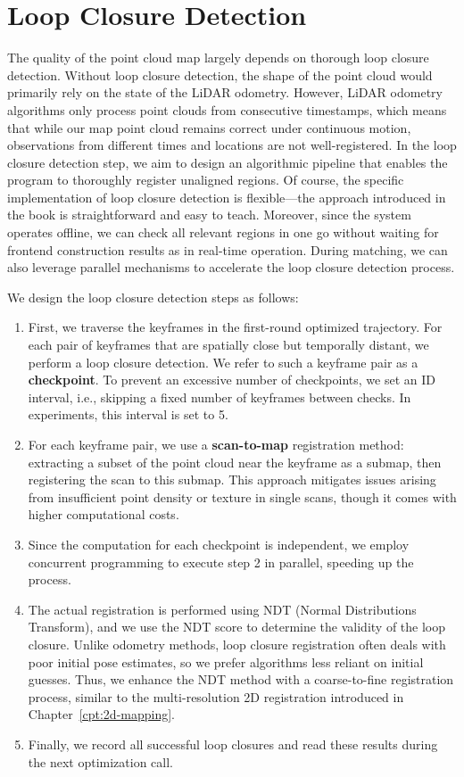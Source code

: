 \section{Loop Closure Detection}
The quality of the point cloud map largely depends on thorough loop closure detection. Without loop closure detection, the shape of the point cloud would primarily rely on the state of the LiDAR odometry. However, LiDAR odometry algorithms only process point clouds from consecutive timestamps, which means that while our map point cloud remains correct under continuous motion, observations from different times and locations are not well-registered. In the loop closure detection step, we aim to design an algorithmic pipeline that enables the program to thoroughly register unaligned regions. Of course, the specific implementation of loop closure detection is flexible—the approach introduced in the book is straightforward and easy to teach. Moreover, since the system operates offline, we can check all relevant regions in one go without waiting for frontend construction results as in real-time operation. During matching, we can also leverage parallel mechanisms to accelerate the loop closure detection process.

We design the loop closure detection steps as follows:
\begin{enumerate}
	\item First, we traverse the keyframes in the first-round optimized trajectory. For each pair of keyframes that are spatially close but temporally distant, we perform a loop closure detection. We refer to such a keyframe pair as a \textbf{checkpoint}. To prevent an excessive number of checkpoints, we set an ID interval, i.e., skipping a fixed number of keyframes between checks. In experiments, this interval is set to 5.
	\item For each keyframe pair, we use a \textbf{scan-to-map} registration method: extracting a subset of the point cloud near the keyframe as a submap, then registering the scan to this submap. This approach mitigates issues arising from insufficient point density or texture in single scans, though it comes with higher computational costs.
	\item Since the computation for each checkpoint is independent, we employ concurrent programming to execute step 2 in parallel, speeding up the process.
	\item The actual registration is performed using NDT (Normal Distributions Transform), and we use the NDT score to determine the validity of the loop closure. Unlike odometry methods, loop closure registration often deals with poor initial pose estimates, so we prefer algorithms less reliant on initial guesses. Thus, we enhance the NDT method with a coarse-to-fine registration process, similar to the multi-resolution 2D registration introduced in Chapter~\ref{cpt:2d-mapping}.
	\item Finally, we record all successful loop closures and read these results during the next optimization call.
\end{enumerate}

